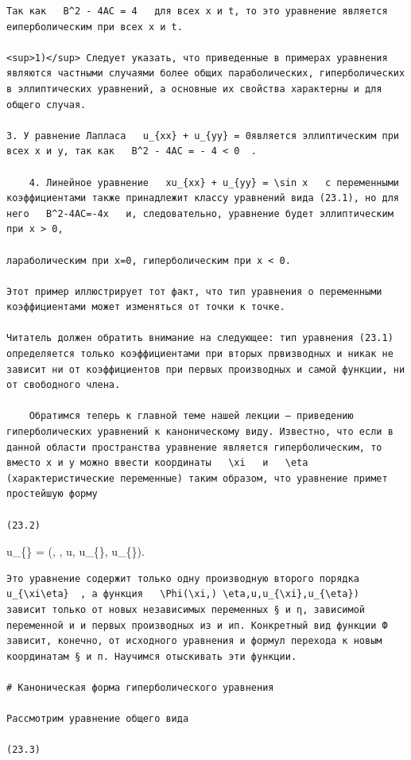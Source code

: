\documentclass[
  ukrainian,
]{article}
\begin{document}
\begin{verbatim}
Так как   B^2 - 4AC = 4   для всех x и t, то это уравнение является еиперболическим при всех x и t.

<sup>1)</sup> Следует указать, что приведенные в примерах уравнения являются частными случаями более общих параболических, гиперболических в эллиптических уравнений, а основные их свойства характерны и для общего случая.

3. У равнение Лапласа   u_{xx} + u_{yy} = 0является эллиптическим при всех x и y, так как   B^2 - 4AC = - 4 < 0  .

    4. Линейное уравнение   xu_{xx} + u_{yy} = \sin x   с переменными коэффициентами также принадлежит классу уравнений вида (23.1), но для него   B^2-4AC=-4x   и, следовательно, уравнение будет эллиптическим при x > 0,

лараболическим при x=0, гиперболическим при x < 0.

Этот пример иллюстрирует тот факт, что тип уравнения о переменными коэффициентами может изменяться от точки к точке.

Читатель должен обратить внимание на следующее: тип уравнения (23.1) определяется только коэффициентами при вторых првизводных и никак не зависит ни от коэффициентов при первых производных и самой функции, ни от свободного члена.

    Обратимся теперь к главной теме нашей лекции — приведению гиперболических уравнений к каноническому виду. Известно, что если в данной области пространства уравнение является гиперболическим, то вместо x и y можно ввести координаты   \xi   и   \eta  (характеристические переменные) таким образом, что уравнение примет простейшую форму

(23.2)
\end{verbatim}

u\_\{\xi\eta\} = \Phi(\xi, \eta, u, u\_\{\xi\}, u\_\{\eta\}).

\begin{verbatim}
Это уравнение содержит только одну производную второго порядка   u_{\xi\eta}  , а функция   \Phi(\xi,) \eta,u,u_{\xi},u_{\eta})   зависит только от новых независимых переменных § и η, зависимой переменной и и первых производных из и ип. Конкретный вид функции Ф зависит, конечно, от исходного уравнения и формул перехода к новым координатам § и п. Научимся отыскивать эти функции.

# Каноническая форма гиперболического уравнения

Рассмотрим уравнение общего вида

(23.3)
\end{verbatim}
\end{document}
